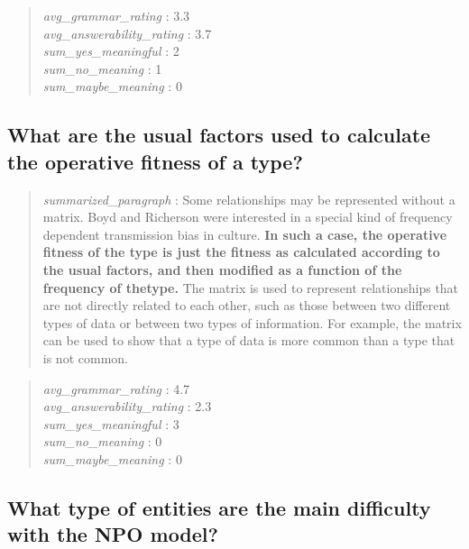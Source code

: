 \begin{quote}
\emph{avg\_grammar\_rating} : 3.3\\
\emph{avg\_answerability\_rating} : 3.7\\
\emph{sum\_yes\_meaningful} : 2\\
\emph{sum\_no\_meaning} : 1\\
\emph{sum\_maybe\_meaning} : 0
\end{quote}

\hypertarget{what-are-the-usual-factors-used-to-calculate-the-operative-fitness-of-a-type}{%
\subsection{What are the usual factors used to calculate the operative
fitness of a
type?}\label{what-are-the-usual-factors-used-to-calculate-the-operative-fitness-of-a-type}}

\begin{quote}
\emph{summarized\_paragraph} : Some relationships may be represented
without a matrix. Boyd and Richerson were interested in a special kind
of frequency dependent transmission bias in culture. \textbf{In such a
case, the operative fitness of the type is just the fitness as
calculated according to the usual factors, and then modified as a
function of the frequency of thetype.} The matrix is used to represent
relationships that are not directly related to each other, such as those
between two different types of data or between two types of information.
For example, the matrix can be used to show that a type of data is more
common than a type that is not common.
\end{quote}

\begin{quote}
\emph{avg\_grammar\_rating} : 4.7\\
\emph{avg\_answerability\_rating} : 2.3\\
\emph{sum\_yes\_meaningful} : 3\\
\emph{sum\_no\_meaning} : 0\\
\emph{sum\_maybe\_meaning} : 0
\end{quote}

\hypertarget{what-type-of-entities-are-the-main-difficulty-with-the-npo-model}{%
\subsection{What type of entities are the main difficulty with the NPO
model?}\label{what-type-of-entities-are-the-main-difficulty-with-the-npo-model}}

